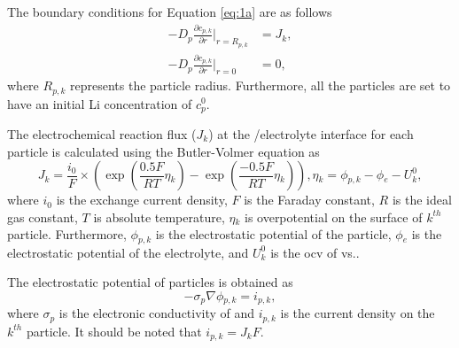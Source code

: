 \documentclass{article}
\begin{document}
The boundary conditions for Equation \ref{eq:1a} are as
follows \cite{newman1993,newman1994}
\begin{subequations}
    \begin{align}
      -D_p\frac{\partial c_{p,k}}{\partial r}|_{r=R_{p,k}} &= J_{k}, \label{eq:1b} \\
      -D_p\frac{\partial c_{p,k}}{\partial r}|_{r=0} &= 0, \label{eq:1c}
    \end{align}
\end{subequations}
where $R_{p,k}$ represents the particle radius. Furthermore, all the
particles are set to have an initial Li concentration of $c_p^0$.

The electrochemical reaction flux ($J_k$) at the \nca{}/electrolyte
interface for each particle is calculated using the Butler-Volmer
equation as \cite{newman1993,newman1994}
\begin{subequations}
  \begin{equation}
    J_k = \frac{i_0}{F}\times\left(\exp \left(\frac{0.5F}{RT}\eta{}_k\right)-\exp
    \left(\frac{-0.5F}{RT}\eta{}_k\right)\right),
    \label{eq:2a}
  \end{equation}
  \begin{equation}
    \eta{}_k=\phi{}_{p,k}-\phi{}_e-U_k^0,
    \label{eq:2b}
  \end{equation}
\end{subequations}
where $i_0$ is the exchange current density, $F$ is the Faraday
constant, $R$ is the ideal gas constant, $T$ is absolute temperature,
$\eta{}_k$ is overpotential on the surface of $k^{\mathit{th}}$
particle. Furthermore, $\phi{}_{p,k}$ is the electrostatic potential of the
particle, $\phi{}_e$ is the electrostatic potential of the electrolyte, and
$U_k^0$ is the \gls{ocv} of \nca{} vs..

The electrostatic potential of \nca{} particles is obtained as \cite{newman1993,newman1994}
\begin{equation}
  -\sigma{}_p\nabla{}\phi{}_{p,k}=i_{p,k},
  \label{eq:3}
\end{equation}
where $\sigma{}_p$ is the electronic conductivity of \nca{} and $i_{p,k}$ is
the current density on the $k^{\mathit{th}}$ particle. It should be
noted that $i_{p,k}=J_kF$.
\end{document}
